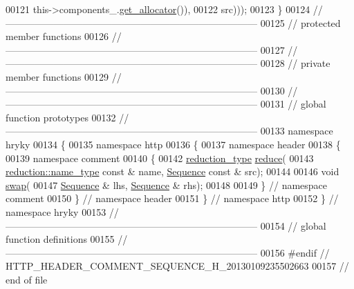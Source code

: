 \begin{DoxyCode}
00121                     this->components\_.\hyperlink{classhryky_1_1_vector_a435d9e9b71aaf09e9281e671742ba2e0}{get_allocator}()),
00122                 src)));
00123 \}
00124 \textcolor{comment}{//
      ------------------------------------------------------------------------------}
00125 \textcolor{comment}{// protected member functions}
00126 \textcolor{comment}{//
      ------------------------------------------------------------------------------}
00127 \textcolor{comment}{//
      ------------------------------------------------------------------------------}
00128 \textcolor{comment}{// private member functions}
00129 \textcolor{comment}{//
      ------------------------------------------------------------------------------}
00130 \textcolor{comment}{//
      ------------------------------------------------------------------------------}
00131 \textcolor{comment}{// global function prototypes}
00132 \textcolor{comment}{//
      ------------------------------------------------------------------------------}
00133 \textcolor{keyword}{namespace }hryky
00134 \{
00135 \textcolor{keyword}{namespace }http
00136 \{
00137 \textcolor{keyword}{namespace }header
00138 \{
00139 \textcolor{keyword}{namespace }comment
00140 \{
00142     \hyperlink{classhryky_1_1_intrusive_ptr}{reduction_type} \hyperlink{namespacehryky_1_1http_a08fc36a78a8e2908140fcd102829a566}{reduce}(
00143         \hyperlink{classhryky_1_1reduction_1_1_string}{reduction::name_type} \textcolor{keyword}{const} & name, \hyperlink{classhryky_1_1http_1_1header_1_1comment_1_1_sequence}{Sequence} \textcolor{keyword}{const} & src);
00144 
00146     \textcolor{keywordtype}{void} \hyperlink{namespacehryky_1_1http_a38e62595ad532d18fbc65ceb61973aec}{swap}(
00147         \hyperlink{classhryky_1_1http_1_1header_1_1comment_1_1_sequence}{Sequence} & lhs, \hyperlink{classhryky_1_1http_1_1header_1_1comment_1_1_sequence}{Sequence} & rhs);
00148 
00149 \} \textcolor{comment}{// namespace comment}
00150 \} \textcolor{comment}{// namespace header}
00151 \} \textcolor{comment}{// namespace http}
00152 \} \textcolor{comment}{// namespace hryky}
00153 \textcolor{comment}{//
      ------------------------------------------------------------------------------}
00154 \textcolor{comment}{// global function definitions}
00155 \textcolor{comment}{//
      ------------------------------------------------------------------------------}
00156 \textcolor{preprocessor}{#endif // HTTP\_HEADER\_COMMENT\_SEQUENCE\_H\_20130109235502663}
00157 \textcolor{preprocessor}{}\textcolor{comment}{// end of file}
\end{DoxyCode}
